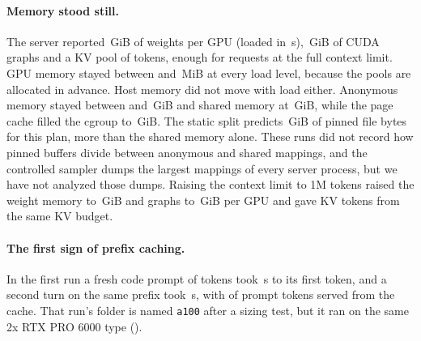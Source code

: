 \paragraph{Memory stood still.}
The server reported \,GiB of weights per GPU (loaded in \,s),
\,GiB of CUDA graphs and a KV pool of  tokens, enough for
 requests at the full context limit. GPU memory stayed between  and
\,MiB at every load level, because the pools are allocated in advance. Host memory did not move
with load either. Anonymous memory stayed between  and \,GiB and
shared memory at \,GiB, while the page cache filled the cgroup to
\,GiB. The static split predicts \,GiB of pinned file bytes for
this plan, more than the shared memory alone. These runs did not record how pinned buffers divide between anonymous
and shared mappings, and the controlled sampler dumps the largest mappings of every server process, but we have not
analyzed those dumps. Raising the context limit to 1M tokens raised the weight memory to
\,GiB and graphs to \,GiB per GPU and gave
 KV tokens from the same KV budget.

\paragraph{The first sign of prefix caching.}
In the first run a fresh code prompt of  tokens took
\,s to its first token, and a second turn on the same prefix took
\,s, with  of
 prompt tokens served from the cache. That run's folder is named
\texttt{a100} after a sizing test, but it ran on the same 2x RTX PRO 6000 type
().

